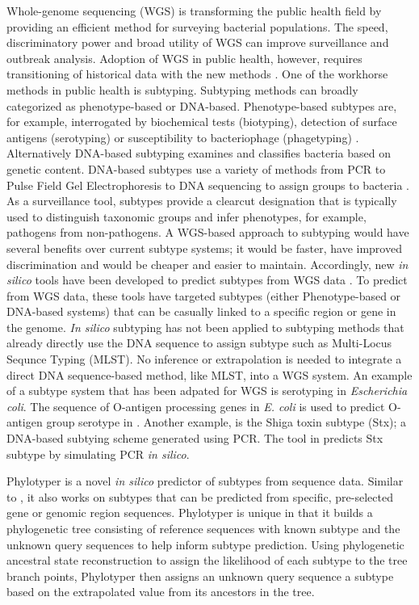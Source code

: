 \documentclass{bioinfo}
\begin{document}
Whole-genome sequencing (WGS) is transforming the public health field by providing an efficient method for surveying bacterial populations.
The speed, discriminatory power and broad utility of WGS can improve surveillance and outbreak analysis.
Adoption of WGS in public health, however, requires transitioning of historical data with the new methods \citep{Jenkins2015}.
One of the workhorse methods in public health is subtyping.
Subtyping methods can broadly categorized as phenotype-based or DNA-based.
Phenotype-based subtypes are, for example, interrogated by biochemical tests (biotyping), detection of surface antigens (serotyping) or susceptibility to bacteriophage (phagetyping) \citep{Wiedmann2002}.
Alternatively DNA-based subtyping examines and classifies bacteria based on genetic content.
DNA-based subtypes use a variety of methods from PCR to Pulse Field Gel Electrophoresis to DNA sequencing to assign groups to bacteria \citep{Wiedmann2002}.
As a surveillance tool, subtypes provide a clearcut designation that is typically used to distinguish taxonomic groups and infer phenotypes, for example, pathogens from non-pathogens.
A WGS-based approach to subtyping would have several benefits over current subtype systems; it would be faster, have improved discrimination and would be cheaper and easier to maintain\citep{Jenkins2015}.
Accordingly, new \textit{in silico} tools have been developed to predict subtypes from WGS data \citep{Joensen2015,Ingle2016,CARRILLO2016}.
To predict from WGS data, these tools have targeted subtypes (either Phenotype-based or DNA-based systems) that can be casually linked to a specific region or gene in the genome.
\textit{In silico} subtyping has not been applied to subtyping methods that already directly use the DNA sequence to assign subtype such as Multi-Locus Sequnce Typing (MLST). 
No inference or extrapolation is needed to integrate a direct DNA sequence-based method, like MLST, into a WGS system.
An example of a subtype system that has been adpated for WGS is serotyping in \textit{Escherichia coli}.
The sequence of O-antigen processing genes in \textit{E. coli} is used to predict O-antigen group serotype in \citep{Joensen2015,Ingle2016}.
Another example, is the Shiga toxin subtype (Stx); a DNA-based subtying scheme generated using PCR.
The tool in \citep{CARRILLO2016} predicts Stx subtype by simulating PCR \textit{in silico}.

Phylotyper is a novel \textit{in silico} predictor of subtypes from sequence data.
Similar to \citep{Joensen2015,Ingle2016,CARRILLO2016}, it also works on subtypes that can be predicted from specific, pre-selected gene or genomic region sequences.
Phylotyper is unique in that it builds a phylogenetic tree consisting of reference sequences with known subtype and the unknown query sequences to help inform subtype prediction.
Using phylogenetic ancestral state reconstruction to assign the likelihood of each subtype to the tree branch points, Phylotyper then assigns an unknown query sequence a subtype based on the extrapolated value from its ancestors in the tree.
\end{document}
